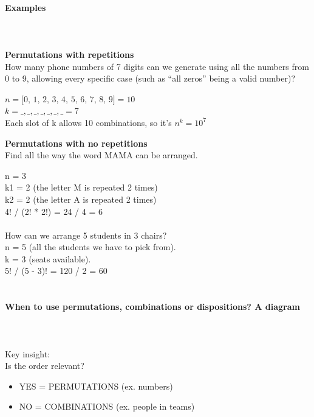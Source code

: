 \documentclass{article}
\begin{document}
\paragraph{Examples}\mbox{} \\
\mbox{} \\
\textbf{Permutations with repetitions} \\ 
How many phone numbers of 7 digits can we generate using all the numbers from 0 to 9, allowing every specific case (such as “all zeros” being a valid number)?

$n = \text{[0, 1, 2, 3, 4, 5, 6, 7, 8, 9]} = 10$ \\
$k = \_, \_, \_, \_, \_, \_, \_ = 7$ \\ 
Each slot of k allows 10 combinations, so it’s $n^k = 10^7$

\textbf{Permutations with no repetitions} \\
Find all the way the word MAMA can be arranged. 

n = 3 \\ 
k1 = 2 (the letter M is repeated 2 times) \\
k2 = 2 (the letter A is repeated 2 times) \\ 
4! / (2! * 2!) = 24 / 4 = 6 \mbox{} \\
\mbox{} \\
How can we arrange 5 students in 3 chairs? \\ 

n = 5 (all the students we have to pick from). \\
k = 3 (seats available). \\
5! / (5 - 3)! = 120 / 2 = 60 \mbox{} \\
\mbox{} \\

\paragraph{When to use permutations, combinations or dispositions? A diagram}\mbox{} \\
\mbox{} \\
Key insight: \\ 
Is the order relevant?
\begin{itemize}
    \item YES = PERMUTATIONS (ex. numbers)
    \item NO = COMBINATIONS (ex. people in teams)
\end{itemize}
\end{document}
